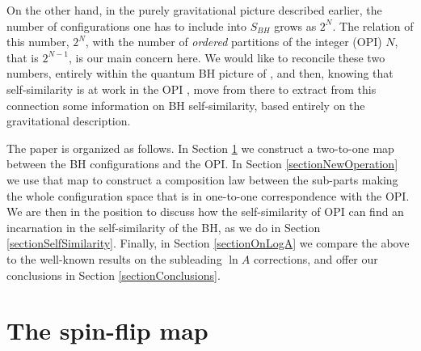 \documentclass[aps,prd,showkeys,nofootinbib,superscriptaddress]{revtex4-2}
\begin{document}
On the other hand, in the purely gravitational picture described earlier, the number of configurations one has to include into $S_{BH}$ grows as $2^N$. The relation of this number, $2^N$, with the number of \textit{ordered} partitions of the integer (OPI) $N$, that is $2^{N-1}$, is our main concern here. We would like to reconcile these two numbers, entirely within the quantum BH picture of \cite{mukhanov,bekenstein2, bekenstein3}, and then, knowing that self-similarity is at work in the OPI \cite{Blanchard:2004du}, move from there to extract from this connection some information on BH self-similarity, based entirely on the gravitational description.

The paper is organized as follows. In Section \ref{sectionSpinFlip} we construct a two-to-one map between the BH configurations and the OPI. In Section \ref{sectionNewOperation} we use that map to construct a composition law between the sub-parts making the whole configuration space that is in one-to-one correspondence with the OPI. We are then in the position to discuss how the self-similarity of OPI can find an incarnation in the self-similarity of the BH, as we do in Section \ref{sectionSelfSimilarity}. Finally, in Section \ref{sectionOnLogA} we compare the above to the well-known results on the subleading $\ln A$ corrections, and offer our conclusions in Section \ref{sectionConclusions}.





\section{The spin-flip map}\label{sectionSpinFlip}
\end{document}
